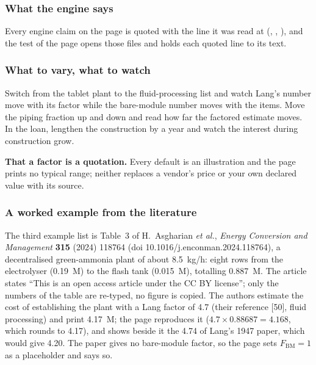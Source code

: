 \documentclass[11pt,a4paper]{article}
\begin{document}
\subsubsection*{What the engine says}

Every engine claim on the page is quoted with the line it was read at
(, , ), and the
test of the page opens those files and holds each quoted line to its text.

\subsubsection*{What to vary, what to watch}

\begin{tryit}
Switch from the tablet plant to the fluid-processing list and watch Lang's
number move with its factor while the bare-module number moves with the
items.  Move the piping fraction up and down and read how far the factored
estimate moves.  In the loan, lengthen the construction by
a year and watch the interest during construction grow.
\end{tryit}

\begin{pitfall}
\textbf{That a factor is a quotation.}  Every default is an illustration and
the page prints no typical range; neither replaces a vendor's price or your
own declared value with its source.
\end{pitfall}

\subsubsection*{A worked example from the literature}

The third example list is Table~3 of H.~Asgharian \emph{et al.},
\emph{Energy Conversion and Management} \textbf{315} (2024) 118764
(doi 10.1016/j.enconman.2024.118764), a decentralised green-ammonia plant of
about 8.5~kg/h: eight rows from the electrolyser (0.19~M\texteuro) to the
flash tank (0.015~M\texteuro), totalling 0.887~M\texteuro.  The article states
``This is an open access article under the CC BY license''; only the numbers
of the table are re-typed, no figure is copied.  The authors estimate the
cost of establishing the plant with a Lang factor of 4.7 (their reference
[50], fluid processing) and print 4.17~M\texteuro; the page reproduces it
($4.7\times0.88687=4.168$, which rounds to 4.17), and shows beside it the
4.74 of Lang's 1947 paper, which would give 4.20.  The paper gives no
bare-module factor, so the page sets $F_{\mathrm{BM}}=1$ as a placeholder
and says so.
\end{document}
